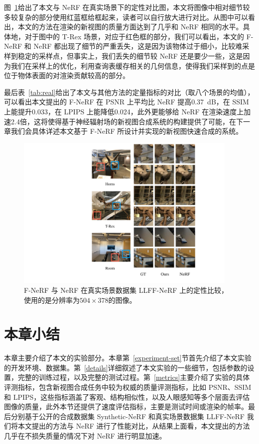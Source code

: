 图~\ref{fig:llff}给出了本文与 NeRF 在真实场景下的定性对比图，本文将图像中相对细节较多较复杂的部分使用红蓝框给框起来，读者可以自行放大进行对比。从图中可以看出，本文的方法在渲染的新视图的质量方面达到了几乎和 NeRF 相同的水平。具体地，对于图中的 T-Rex 场景，对应于红色框的部分，我们可以看出，本文的 F-NeRF 和 NeRF 都出现了细节的严重丢失，这是因为该物体过于细小，比较难采样到稳定的采样点，但事实上，我们丢失的细节较 NeRF 还是要少一些，这是因为我们在采样上的优化，利用查询表缓存相关的几何信息，使得我们采样到的点是位于物体表面的对渲染贡献较高的部分。

最后表~\ref{tab:real}给出了本文与其他方法的定量指标的对比（取八个场景的均值），可以看出本文提出的 F-NeRF 在 PSNR 上平均比 NeRF 提高\SI{0.37}{dB}，在 SSIM 上能提升0.033，在 LPIPS 上能降低0.024，此外更能够给 NeRF 在渲染速度上加速2.4倍，这将使得基于神经辐射场的新视图合成系统的构建提供了可能，在下一章我们会具体详述本文基于 F-NeRF 所设计并实现的新视图快速合成的系统。


\begin{figure}[tbhp]
    \centering
    \includegraphics[width=0.95\textwidth]{figures/llff.pdf}
    \caption{F-NeRF 与 NeRF 在真实场景数据集 LLFF-NeRF 上的定性比较，使用的是分辨率为$504 \times 378$的图像。}
    \label{fig:llff}
\end{figure}
\newpage

\section{本章小结}
本章主要介绍了本文的实验部分。本章第~\ref{experiment-set}节首先介绍了本文实验的开发环境、数据集。第~\ref{details}详细叙述了本文实验的一些细节，包括参数的设置，完整的训练过程，以及完整的测试过程。第~\ref{metrics}主要介绍了实验的具体评测指标，包含新视图合成任务中较为权威的质量评测指标，比如 PSNR、SSIM 和 LPIPS，这些指标涵盖了客观、结构相似性，以及人眼感知等多个层面去评估图像的质量，此外本节还提供了速度评估指标，主要是测试时间或渲染的帧率。最后分别基于公开的合成数据集 Synthetic-NeRF 和真实场景数据集 LLFF-NeRF 我们将本文提出的方法与 NeRF 进行了性能对比，从结果上面看，本文提出的方法几乎在不损失质量的情况下对 NeRF 进行明显加速。

